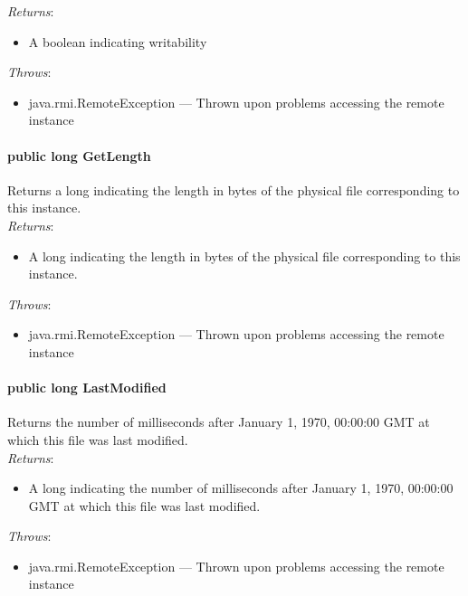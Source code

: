 \documentclass[$Date: 2003/06/26 19:29:31 $]{glabarticle}
\begin{document}
\textit{Returns}:
\begin{itemize}
\item[] A boolean indicating writability
\end{itemize}

 \textit{Throws}:
 \begin{itemize}
 \item[] java.rmi.RemoteException --- Thrown upon problems accessing the remote instance 
 \end{itemize}
 
\paragraph{public long GetLength}

Returns a long indicating the length in bytes of the physical file
corresponding to this instance.\\

\textit{Returns}:
\begin{itemize}
\item[] A long indicating the length in bytes of the physical file corresponding to this instance. 
\end{itemize}

 \textit{Throws}:
 \begin{itemize}
 \item[] java.rmi.RemoteException --- Thrown upon problems accessing the remote instance 
 \end{itemize}
 
\paragraph{public long LastModified}

Returns the number of milliseconds after January 1, 1970, 00:00:00 GMT
at which this file was last modified.\\

\textit{Returns}:
\begin{itemize}
\item[] A long indicating the number of milliseconds after January 1, 1970, 00:00:00 GMT at which this file 
was last modified.
\end{itemize}

 \textit{Throws}:
 \begin{itemize}
 \item[] java.rmi.RemoteException --- Thrown upon problems accessing the remote instance 
 \end{itemize}
 
\end{document}
